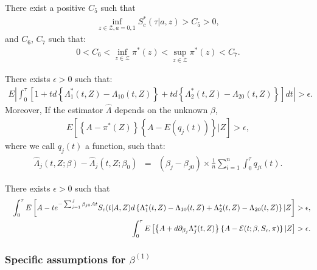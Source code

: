 \documentclass[11pt]{article}
\newcommand{\eqnn}{\begin{eqnarray*}}
\newcommand{\een}{\end{eqnarray*}}
\begin{document}
\begin{assumptionS}\label{ass4n}
There exist a positive $C_5$ such that 
\eqnn \inf_{z \in \mathcal{Z}, a=0,1}S^{*}_c(\tau | a,z)>C_5>0,\een
and $C_6$, $C_7$ such that:
\eqnn
0<C_6<\inf_{z \in \mathcal{Z}} \pi^{*}(z) <\sup_{z \in \mathcal{Z}} \pi^{*}(z)<C_7.
\een
\end{assumptionS}



\begin{assumptionS}\label{ass4n1}
There exists $\epsilon>0$ such that: 
\eqnn
E\left|\int_0^{\tau}\left[1+td\left\{\Lambda_1^{*}(t,Z)-\Lambda_{10}(t,Z)\right\}+t d\left\{\Lambda_2^{*}(t,Z)-\Lambda_{20}(t,Z)\right\}\right]dt\right|>\epsilon.
\een
Moreover, If the estimator $\hat \Lambda$ depends on the unknown $\beta$,
\eqnn
E\left[\left\{A -\pi^{*}( Z)\right\}\left\{A-E(q_j(t))\right\} | Z\right]>\epsilon,
\een
where we call $q_{j}(t)$ a function, such that:
\eqnn
\hat \Lambda_{j}(t, Z ; \beta)-\hat \Lambda_{j}(t, Z ; \beta_0)&=&(\beta_j-\beta_{j0})\times\frac{1}{n}\sum_{i=1}^n\int_0^\tau q_{ji}(t).
\een
\end{assumptionS}



\begin{assumptionS}\label{lowerboundsc1}
There exists $\epsilon>0$ such that
\eqnn
&&\int_0^\tau E\left[A-te^{-\sum_{j=1}^J\beta_{j0}At}S_c(t | A,Z)d\left\{\Lambda^{*}_1(t,Z)-\Lambda_{10}(t,Z)+\Lambda^{*}_2(t,Z)-\Lambda_{20}(t,Z)\right\}| Z\right]>\epsilon,\\
&&\int_0^\tau E\left[\left\{A+d\partial_{\beta_j}\Lambda^{*}_j(t,Z)\right\} \left\{A-{\cal E}(t; \beta, S_c, \pi)\right\}| Z\right]>\epsilon.
\een
\end{assumptionS}




\subsubsection{Specific assumptions for $\beta^{(1)}$}
\end{document}
